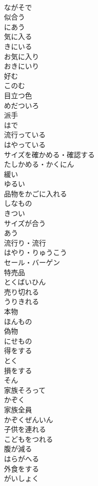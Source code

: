 \documentclass[8pt]{extreport}
\begin{document}
\begin{CJK}{UTF8}{min}
\\	ながそで
\\	似合う	
\\	にあう
\\	気に入る	
\\	きにいる
\\	お気に入り	
\\	おきにいり
\\	好む	
\\	このむ
\\	目立つ色	
\\	めだついろ
\\	派手	
\\	はで
\\	流行っている	
\\	はやっている
\\	サイズを確かめる・確認する	
\\	たしかめる・かくにん
\\	緩い	
\\	ゆるい
\\	品物をかごに入れる	
\\	しなもの
\\	きつい	
\\	サイズが合う	
\\	あう
\\	流行り・流行	
\\	はやり・りゅうこう
\\	セール・バーゲン	
\\	特売品	
\\	とくばいひん
\\	売り切れる	
\\	うりきれる
\\	本物	
\\	ほんもの
\\	偽物	
\\	にせもの
\\	得をする	
\\	とく
\\	損をする	
\\	そん
\\	家族そろって	
\\	かぞく
\\	家族全員	
\\	かぞくぜんいん
\\	子供を連れる	
\\	こどもをつれる
\\	腹が減る	
\\	はらがへる
\\	外食をする	
\\	がいしょく

\end{CJK}
\end{document}
